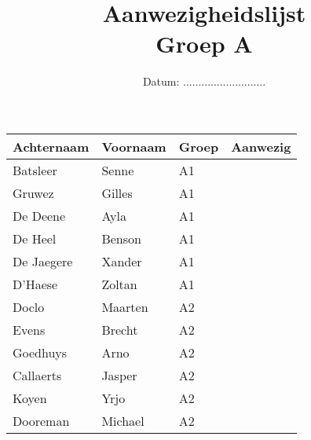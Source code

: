 \documentclass[12pt,a4paper]{article}
\title{\textbf{Aanwezigheidslijst}\\Groep A}
\author{}
\date{Datum: ...........................}
\begin{document}
\maketitle

\begin{table}[!h]
\centering
\begin{tabular}{lllm{8cm}}
\toprule[1.5pt]
\textbf{Achternaam} & \textbf{Voornaam} & \textbf{Groep} & \textbf{Aanwezig} \\
\midrule[1.5pt]
Batsleer & Senne & A1 & \\
\midrule
Gruwez & Gilles & A1 & \\
\midrule
De Deene & Ayla & A1 & \\
\midrule
De Heel & Benson & A1 &  \\
\midrule
De Jaegere & Xander & A1 & \\
\midrule
D'Haese & Zoltan & A1 & \\
\midrule[1.5pt]
Doclo & Maarten & A2 & \\
\midrule
Evens & Brecht & A2  &  \\
\midrule
Goedhuys & Arno & A2  & \\
\midrule
Callaerts & Jasper & A2  &\\
\midrule
Koyen & Yrjo & A2  & \\
\midrule
Dooreman & Michael & A2 &\\
\bottomrule[1.5pt]
\end{tabular}
\end{table}
\end{document}

